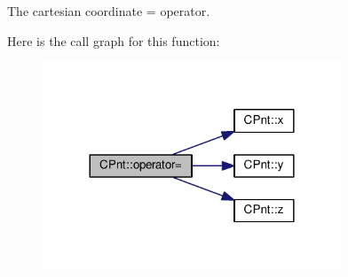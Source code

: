 The cartesian coordinate = operator. 



Here is the call graph for this function\-:\nopagebreak
\begin{figure}[H]
\begin{center}
\leavevmode
\includegraphics[width=252pt]{classCPnt_abd18aa7c83ac70f5e73847a8cd154e9d_cgraph}
\end{center}
\end{figure}


